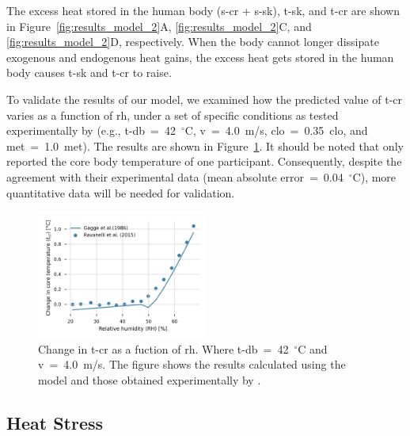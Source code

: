 The excess heat stored in the human body (\acs{s-cr} + \acs{s-sk}), \ac{t-sk}, and \ac{t-cr} are shown in Figure~\ref{fig:results_model_2}A, \ref{fig:results_model_2}C, and \ref{fig:results_model_2}D, respectively.
When the body cannot longer dissipate exogenous and endogenous heat gains, the excess heat gets stored in the human body causes \ac{t-sk} and \ac{t-cr} to raise.

To validate the results of our model, we examined how the predicted value of \ac{t-cr} varies as a function of \ac{rh}, under a set of specific conditions as tested experimentally by  (e.g., \ac{t-db}~=~42~$^{\circ}$C, \ac{v}~=~4.0~m/s, \ac{clo}~=~0.35~clo, and \ac{met}~=~1.0~met).
The results are shown in Figure~\ref{fig:comparison_ravanelli}.
It should be noted that  only reported the core body temperature of one participant.
Consequently, despite the agreement with their experimental data (mean absolute error~=~0.04~$^{\circ}$C), more quantitative data will be needed for validation.

\begin{figure}[thb!]
    \centering
    \includegraphics[width=0.5\textwidth]{figures/comparison_ravanelli}
    \caption{Change in \acf{t-cr} as a fuction of \acf{rh}.
    Where \ac{t-db}~=~42~$^{\circ}$C and \ac{v}~=~4.0~m/s.
    The figure shows the results calculated using the  model and those obtained experimentally by .}
    \label{fig:comparison_ravanelli}
\end{figure}

\subsection{Heat Stress}\label{subsec:heat-stress}

